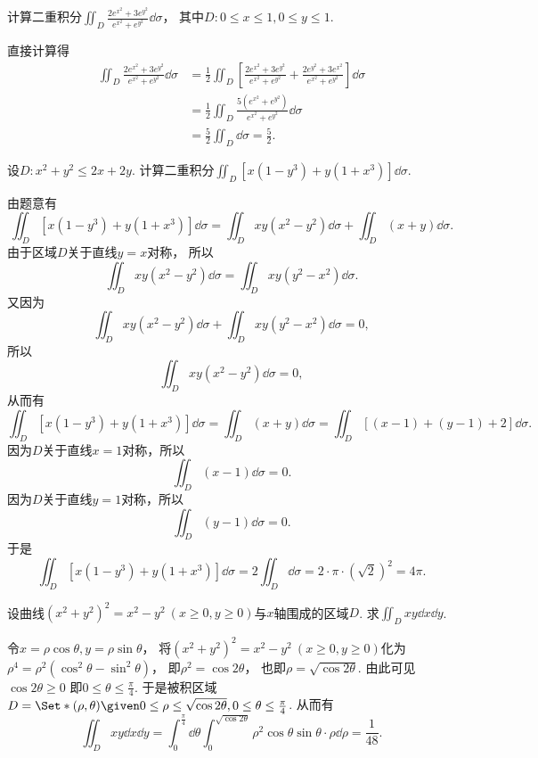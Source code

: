 \begin{example}
计算二重积分\(\iint_D \frac{2 e^{x^2} + 3 e^{y^2}}{e^{x^2} + e^{y^2}} \dd\sigma\)，
其中\(D: 0 \leq x \leq 1, 0 \leq y \leq 1\).
\begin{solution}
直接计算得\begin{align*}
	\iint_D \frac{2 e^{x^2} + 3 e^{y^2}}{e^{x^2} + e^{y^2}} \dd\sigma
	&= \frac12 \iint_D \left[
		\frac{2 e^{x^2} + 3 e^{y^2}}{e^{x^2} + e^{y^2}}
		+ \frac{2 e^{y^2} + 3 e^{x^2}}{e^{x^2} + e^{y^2}}
	\right] \dd\sigma \\
	&= \frac12 \iint_D \frac{5 (e^{x^2} + e^{y^2})}{e^{x^2} + e^{y^2}} \dd\sigma \\
	&= \frac52 \iint_D \dd\sigma
	= \frac52.
\end{align*}
\end{solution}
\end{example}

\begin{example}
设\(D: x^2+y^2\leq2x+2y\).
计算二重积分\(\iint_D [x(1-y^3)+y(1+x^3)] \dd\sigma\).
\begin{solution}
由题意有\[
	\iint_D [x(1-y^3)+y(1+x^3)] \dd\sigma
	= \iint_D xy(x^2-y^2) \dd\sigma
	+ \iint_D (x+y) \dd\sigma.
\]
由于区域\(D\)关于直线\(y=x\)对称，
所以\[
	\iint_D xy(x^2-y^2) \dd\sigma
	= \iint_D xy(y^2-x^2) \dd\sigma.
\]
又因为\[
	\iint_D xy(x^2-y^2) \dd\sigma
	+ \iint_D xy(y^2-x^2) \dd\sigma
	= 0,
\]
所以\[
	\iint_D xy(x^2-y^2) \dd\sigma
	= 0,
\]
从而有\[
	\iint_D [x(1-y^3)+y(1+x^3)] \dd\sigma
	= \iint_D (x+y) \dd\sigma
	= \iint_D [(x-1)+(y-1)+2] \dd\sigma.
\]
因为\(D\)关于直线\(x=1\)对称，所以\[
	\iint_D (x-1) \dd\sigma
	= 0.
\]
因为\(D\)关于直线\(y=1\)对称，所以\[
	\iint_D (y-1) \dd\sigma
	= 0.
\]
于是\[
	\iint_D [x(1-y^3)+y(1+x^3)] \dd\sigma
	= 2 \iint_D \dd\sigma
	= 2 \cdot \pi \cdot (\sqrt2)^2
	= 4\pi.
\]
\end{solution}
\end{example}

\begin{example}
设曲线\((x^2+y^2)^2=x^2-y^2\ (x\geq0,y\geq0)\)与\(x\)轴围成的区域\(D\).
求\(\iint_D x y \dd{x}\dd{y}\).
\begin{solution}
令\(x=\rho\cos\theta,y=\rho\sin\theta\)，
将\((x^2+y^2)^2=x^2-y^2\ (x\geq0,y\geq0)\)化为
\(\rho^4=\rho^2(\cos^2\theta-\sin^2\theta)\)，
即\(\rho^2=\cos2\theta\)，
也即\(\rho=\sqrt{\cos2\theta}\).
由此可见\(\cos2\theta\geq0\)
即\(0\leq\theta\leq\frac\pi4\).
于是被积区域\(D = \Set*{ (\rho,\theta) \given 0\leq\rho\leq\sqrt{\cos2\theta}, 0\leq\theta\leq\frac\pi4 }\).
从而有\begin{equation*}
	\iint_D x y \dd{x}\dd{y}
	= \int_0^{\frac\pi4} \dd\theta
	\int_0^{\sqrt{\cos2\theta}} \rho^2 \cos\theta \sin\theta \cdot \rho \dd\rho
	= \frac1{48}.
\end{equation*}
\end{solution}
\end{example}
